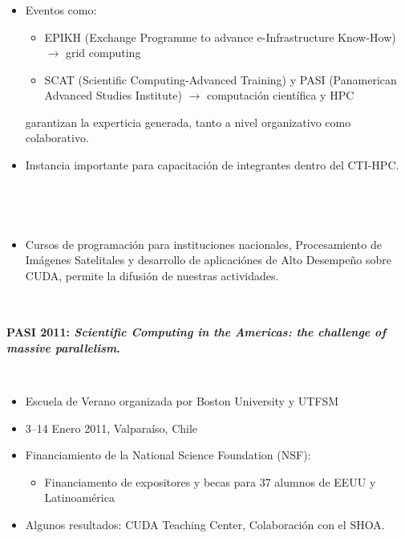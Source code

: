\frame
{
\frametitle{}


\begin{columns}
\begin{itemize}
\item Eventos como:
\begin{itemize} 
\item  EPIKH (Exchange Programme to advance e-Infrastructure Know-How) $\rightarrow$ grid computing
\item SCAT (Scientific Computing-Advanced Training) y PASI (Panamerican Advanced Studies Institute) $\rightarrow$ computaci\'{o}n cient\'{i}fica y HPC
\end{itemize} 
garantizan 
la experticia generada, tanto a nivel organizativo como colaborativo. 
\item Instancia importante para capacitación de integrantes dentro del CTI-HPC. 
\end{itemize}
\end{columns}
}

\frame
{
\frametitle{}

\begin{columns}
\begin{itemize}
\item Cursos de programación para instituciones nacionales, Procesamiento de Imágenes Satelitales y desarrollo de aplicaciónes de Alto Desempeño sobre CUDA, permite la difusión de nuestras actividades.
\end{itemize}
\end{columns}

}


\frame
{
\frametitle{}
\framesubtitle{PASI 2011: \emph{Scientific Computing in the Americas: the challenge of massive parallelism}.}

\begin{columns}
\begin{itemize}
\item  Escuela de Verano organizada por Boston University y  UTFSM 
\item 3–14 Enero  2011, Valpara\'{i}so, Chile
\item Financiamiento de la National Science Foundation (NSF):
	\begin{itemize}
	\item Financiamento de expositores y becas para 37 alumnos de EEUU y
Latinoamérica
	\end{itemize}
\item Algunos resultados: CUDA Teaching Center, Colaboración con el SHOA.
\end{itemize}
\end{columns}

}

